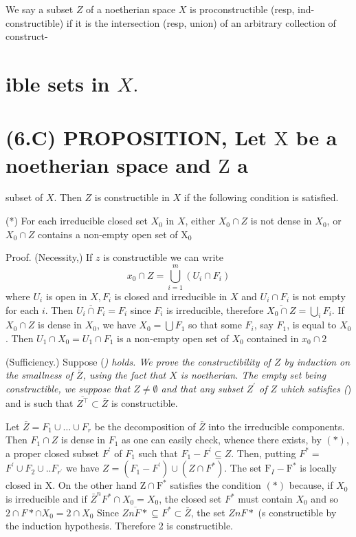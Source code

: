 We say a subset $Z$ of a noetherian space $X$ is proconstructible (resp, ind-constructible) if it is the intersection (resp, union) of an arbitrary collection of construct-

\section{ible sets in $X .$}
\section{(6.C) PROPOSITION, Let $\mathrm{X}$ be a noetherian space and $\mathrm{Z}$ a}
subset of $X$. Then $Z$ is constructible in $X$ if the following condition is satisfied.

(*) For each irreducible closed set $X_{0}$ in $X$, either $X_{0} \cap Z$ is not dense in $X_{0}$, or $X_{0} \cap Z$ contains a non-empty open set of $\mathrm{X}_{0}$

Proof. (Necessity,) If $z$ is constructible we can write
$$
x_{0} \cap Z=\bigcup_{i=1}^{m}\left(U_{i} \cap F_{i}\right)
$$
where $U_{i}$ is open in $X, F_{i}$ is closed and irreducible in $X$ and $U_{i} \cap F_{i}$ is not empty for each $i$. Then $\overline{U_{i} \cap F_{i}}=F_{i}$ since $F_{i}$ is irreducible, therefore $\overline{X_{0} \cap Z}=\bigcup_{i} F_{i}$. If $X_{0} \cap Z$ is dense in $X_{0}$, we have $X_{0}=\bigcup F_{1}$ so that some $F_{i}$, say $F_{1}$, is equal to $X_{0}$. Then $U_{1} \cap X_{0}=U_{1} \cap F_{1}$ is a non-empty open set of $X_{0}$ contained in $x_{0} \cap 2$

(Sufficiency.) Suppose (\textit{) holds. We prove the constructibility of $Z$ by induction on the smallness of $\bar{Z}$, using the fact that $X$ is noetherian. The empty set being constructible, we suppose that $Z \neq \emptyset$ and that any subset $Z^{\prime}$ of $Z$ which satisfies (}) and is such that $\overline{Z^{\top}} \subset \bar{Z}$ is constructible.

Let $\bar{Z}=F_{1} \cup \ldots \cup F_{r}$ be the decomposition of $\bar{Z}$ into the irreducible components. Then $F_{1} \cap Z$ is dense in $F_{1}$ as one can easily check, whence there exists, by $(*)$, a proper closed subset $F^{\prime}$ of $F_{1}$ such that $F_{1}-F^{\prime} \subseteq Z$. Then, putting $F^{*}=$ $F^{\prime} \cup F_{2} \cup . . F_{r^{\prime}}$ we have $Z=\left(F_{1}-F^{\prime}\right) \cup\left(Z \cap F^{*}\right)$. The set $\mathrm{F}_{I}-\mathrm{F}^{*}$ is locally closed in $\mathrm{X}$. On the other hand $\mathrm{Z} \cap \mathrm{F}^{*}$ satisfies the condition $(*)$ because, if $X_{0}$ is irreducible and if $\bar{Z}^{n} F^{*} \cap X_{0}=X_{0}$, the closed set $F^{*}$ must contain $X_{0}$ and so $2 \cap F * \cap X_{0}=2 \cap X_{0}$ Since $\overline{Z n F *} \subseteq F^{*} \subset \bar{Z}$, the set $Z n F *$ (s constructible by the induction hypothesis. Therefore 2 is constructible.

